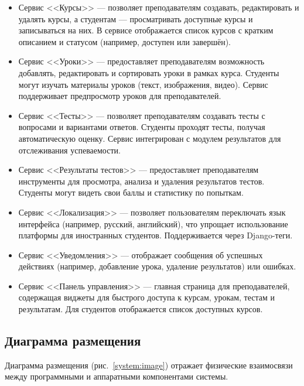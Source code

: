 \begin{itemize}
    \item Сервис <<Курсы>> — позволяет преподавателям создавать, редактировать и удалять курсы, а студентам --- просматривать доступные курсы и записываться на них. В сервисе отображается список курсов с кратким описанием и статусом (например, доступен или завершён).
    
    \item Сервис <<Уроки>> — предоставляет преподавателям возможность добавлять, редактировать и сортировать уроки в рамках курса. Студенты могут изучать материалы уроков (текст, изображения, видео). Сервис поддерживает предпросмотр уроков для преподавателей.

    \item Сервис <<Тесты>> — позволяет преподавателям создавать тесты с вопросами и вариантами ответов. Студенты проходят тесты, получая автоматическую оценку. Сервис интегрирован с модулем результатов для отслеживания успеваемости.

    \item Сервис <<Результаты тестов>> — предоставляет преподавателям инструменты для просмотра, анализа и удаления результатов тестов. Студенты могут видеть свои баллы и статистику по попыткам.

    \item Сервис <<Локализация>> — позволяет пользователям переключать язык интерфейса (например, русский, английский), что упрощает использование платформы для иностранных студентов. Поддерживается через Django-теги.

    \item Сервис <<Уведомления>> — отображает сообщения об успешных действиях (например, добавление урока, удаление результатов) или ошибках.

    \item Сервис <<Панель управления>> — главная страница для преподавателей, содержащая виджеты для быстрого доступа к курсам, урокам, тестам и результатам. Для студентов отображается список доступных курсов.

\end{itemize}

\subsection{Диаграмма размещения}

Диаграмма размещения (рис.~\ref{system:image}) отражает физические взаимосвязи между программными и аппаратными компонентами системы.

